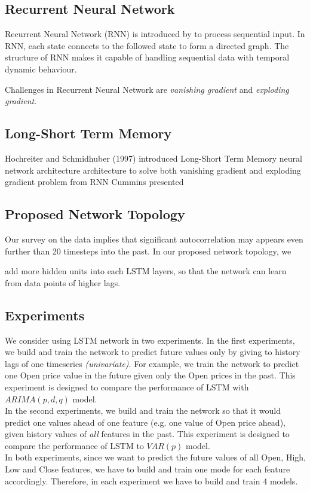 \documentclass[11pt]{article}
\begin{document}
\subsection{Recurrent Neural Network}
Recurrent Neural Network (RNN) is introduced by \cite{rumelhart1988learning} to
process sequential input. In RNN, each state connects to the followed state to
form a directed graph. The structure of RNN makes it capable of handling
sequential data with temporal dynamic behaviour.

Challenges in Recurrent Neural Network are \textit{vanishing gradient} and
\textit{exploding gradient}.

\subsection{Long-Short Term Memory}
Hochreiter and Schmidhuber (1997) \cite{gers1999learning} introduced Long-Short
Term Memory neural network architecture architecture to solve both vanishing
gradient and exploding gradient problem from RNN Cummins presented

\subsection{Proposed Network Topology}
Our survey on the data implies that significant autocorrelation may appears even
further than 20 timesteps into the past. In our proposed network topology, we

add more hidden units into each LSTM layers, so that the network can learn from
data points of higher lags.

\subsection{Experiments}
We consider using LSTM network in two experiments. In the first experiments, we
build and train the network to predict future values only by giving to history
lags of one timeseries \textit{(univariate)}. For example, we train the network to
predict one Open price value in the future given only the Open prices in the
past. This experiment is designed to compare the performance of LSTM with
$ARIMA(p, d, q)$ model.\\ 
In the second experiments, we build and train the network so that it would
predict one values ahead of one feature (e.g. one value of Open price ahead),
given history values of \textit{all} features in the past. This experiment is
designed to compare the performance of LSTM to $VAR(p)$ model.\\
In both experiments, since we want to predict the future values of all Open,
High, Low and Close features, we have to build and train one mode for each
feature accordingly. Therefore, in each experiment we have to build and train 4
models.
\end{document}
